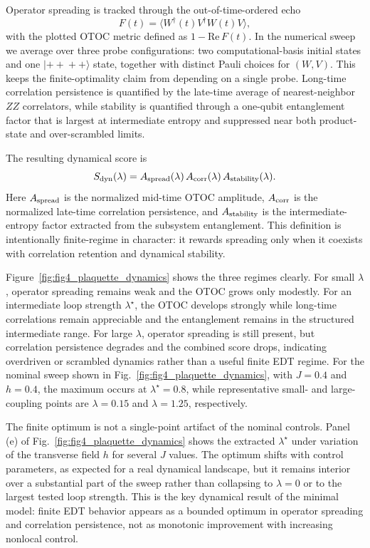 ﻿\documentclass[aps,prx,reprint,superscriptaddress,longbibliography,floatfix]{revtex4-2}
\begin{document}
Operator spreading is tracked through the out-of-time-ordered echo
\begin{equation}
F(t)
=
\langle W^\dagger(t)V^\dagger W(t)V\rangle,
\end{equation}
with the plotted OTOC metric defined as $1-\mathrm{Re}\,F(t)$. In the numerical sweep we average over three probe configurations: two computational-basis initial states and one $|+\!+\!+\!+\rangle$ state, together with distinct Pauli choices for $(W,V)$. This keeps the finite-optimality claim from depending on a single probe. Long-time correlation persistence is quantified by the late-time average of nearest-neighbor $ZZ$ correlators, while stability is quantified through a one-qubit entanglement factor that is largest at intermediate entropy and suppressed near both product-state and over-scrambled limits.

The resulting dynamical score is
\begin{equation}
S_{\rm dyn}(\lambda)
=
A_{\rm spread}(\lambda)\,
A_{\rm corr}(\lambda)\,
A_{\rm stability}(\lambda).
\end{equation}
Here $A_{\rm spread}$ is the normalized mid-time OTOC amplitude, $A_{\rm corr}$ is the normalized late-time correlation persistence, and $A_{\rm stability}$ is the intermediate-entropy factor extracted from the subsystem entanglement. This definition is intentionally finite-regime in character: it rewards spreading only when it coexists with correlation retention and dynamical stability.

Figure~\ref{fig:fig4_plaquette_dynamics} shows the three regimes clearly. For small $\lambda$, operator spreading remains weak and the OTOC grows only modestly. For an intermediate loop strength $\lambda^\star$, the OTOC develops strongly while long-time correlations remain appreciable and the entanglement remains in the structured intermediate range. For large $\lambda$, operator spreading is still present, but correlation persistence degrades and the combined score drops, indicating overdriven or scrambled dynamics rather than a useful finite EDT regime. For the nominal sweep shown in Fig.~\ref{fig:fig4_plaquette_dynamics}, with $J=0.4$ and $h=0.4$, the maximum occurs at $\lambda^\star = 0.8$, while representative small- and large-coupling points are $\lambda = 0.15$ and $\lambda = 1.25$, respectively.

The finite optimum is not a single-point artifact of the nominal controls. Panel (e) of Fig.~\ref{fig:fig4_plaquette_dynamics} shows the extracted $\lambda^\star$ under variation of the transverse field $h$ for several $J$ values. The optimum shifts with control parameters, as expected for a real dynamical landscape, but it remains interior over a substantial part of the sweep rather than collapsing to $\lambda=0$ or to the largest tested loop strength. This is the key dynamical result of the minimal model: finite EDT behavior appears as a bounded optimum in operator spreading and correlation persistence, not as monotonic improvement with increasing nonlocal control.
\end{document}

